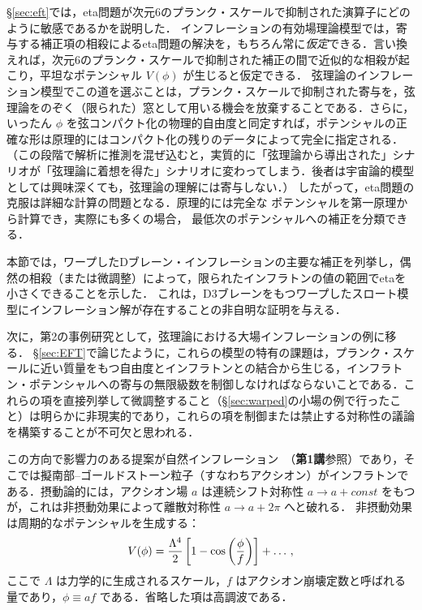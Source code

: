 \S\ref{sec:eft}では，eta問題が次元6のプランク・スケールで抑制された演算子にどのように敏感であるかを説明した．
インフレーションの有効場理論模型では，寄与する補正項の相殺によるeta問題の解決を，もちろん常に{\it 仮定}できる．言い換えれば，次元6のプランク・スケールで抑制された補正の間で近似的な相殺が起こり，平坦なポテンシャル $V(\phi)$ が生じると仮定できる．
弦理論のインフレーション模型でこの道を選ぶことは，プランク・スケールで抑制された寄与を，弦理論をのぞく（限られた）窓として用いる機会を放棄することである．さらに，いったん $\phi$ を弦コンパクト化の物理的自由度と同定すれば，ポテンシャルの正確な形は原理的にはコンパクト化の残りのデータによって完全に指定される．（この段階で解析に推測を混ぜ込むと，実質的に「弦理論から導出された」シナリオが「弦理論に着想を得た」シナリオに変わってしまう．後者は宇宙論的模型としては興味深くても，弦理論の理解には寄与しない．）
したがって，eta問題の克服は詳細な計算の問題となる．原理的には完全な
ポテンシャルを第一原理から計算でき，実際にも多くの場合， %
最低次のポテンシャルへの補正を分類できる．

本節では，ワープしたDブレーン・インフレーションの主要な補正を列挙し，偶然の相殺（または微調整）によって，限られたインフラトンの値の範囲でetaを小さくできることを示した．
これは，D3ブレーンをもつワープしたスロート模型にインフレーション解が存在することの非自明な証明を与える．


\label{sec:LargeField} 

次に，第2の事例研究として，弦理論における大場インフレーションの例に移る．
\S\ref{sec:EFT}で論じたように，これらの模型の特有の課題は，プランク・スケールに近い質量をもつ自由度とインフラトンとの結合から生じる，インフラトン・ポテンシャルへの寄与の無限級数を制御しなければならないことである．これらの項を直接列挙して微調整すること（\S\ref{sec:warped}の小場の例で行ったこと）は明らかに非現実的であり，これらの項を制御または禁止する対称性の議論を構築することが不可欠と思われる．

この方向で影響力のある提案が自然インフレーション~\cite{Freese:1990rb}（{\bf 第1講}参照）であり，そこでは擬南部--ゴールドストーン粒子（すなわちアクシオン）がインフラトンである．摂動論的には，アクシオン場 $a$ は連続シフト対称性 $a\to a+const $ をもつが，これは非摂動効果によって離散対称性 $a\to a+2\pi$ へと破れる．
非摂動効果は周期的なポテンシャルを生成する：
\begin{equation}
V(\phi)=\frac{\Lambda^4}{2} \left[ 1- \cos \left({\phi \over f}\right) \right]+ \ldots\, ,
\end{equation}
ここで $\Lambda$ は力学的に生成されるスケール，$f$ はアクシオン崩壊定数と呼ばれる量であり，$\phi \equiv  a f$ である．省略した項は高調波である．

